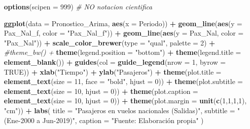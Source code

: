 \documentclass[
]{book}
\newenvironment{Shaded}{\begin{snugshade}}{\end{snugshade}}
\newcommand{\AttributeTok}[1]{\textcolor[rgb]{0.13,0.29,0.53}{#1}}
\newcommand{\CommentTok}[1]{\textcolor[rgb]{0.56,0.35,0.01}{\textit{#1}}}
\newcommand{\ConstantTok}[1]{\textcolor[rgb]{0.56,0.35,0.01}{#1}}
\newcommand{\DecValTok}[1]{\textcolor[rgb]{0.00,0.00,0.81}{#1}}
\newcommand{\FunctionTok}[1]{\textcolor[rgb]{0.13,0.29,0.53}{\textbf{#1}}}
\newcommand{\NormalTok}[1]{#1}
\newcommand{\SpecialCharTok}[1]{\textcolor[rgb]{0.81,0.36,0.00}{\textbf{#1}}}
\newcommand{\StringTok}[1]{\textcolor[rgb]{0.31,0.60,0.02}{#1}}
\begin{document}
\begin{Shaded}
\begin{Highlighting}[]
\FunctionTok{options}\NormalTok{(}\AttributeTok{scipen =} \DecValTok{999}\NormalTok{) }\CommentTok{\# NO notacion cientifica}

\FunctionTok{ggplot}\NormalTok{(}\AttributeTok{data =}\NormalTok{ Pronostico\_Arima, }\FunctionTok{aes}\NormalTok{(}\AttributeTok{x =}\NormalTok{ Periodo)) }\SpecialCharTok{+}
  \FunctionTok{geom\_line}\NormalTok{(}\FunctionTok{aes}\NormalTok{(}\AttributeTok{y =}\NormalTok{ Pax\_Nal\_f, }\AttributeTok{color =} \StringTok{"Pax\_Nal\_f"}\NormalTok{)) }\SpecialCharTok{+}
  \FunctionTok{geom\_line}\NormalTok{(}\FunctionTok{aes}\NormalTok{(}\AttributeTok{y =}\NormalTok{ Pax\_Nal, }\AttributeTok{color =} \StringTok{"Pax\_Nal"}\NormalTok{)) }\SpecialCharTok{+}
  \FunctionTok{scale\_color\_brewer}\NormalTok{(}\AttributeTok{type =} \StringTok{"qual"}\NormalTok{, }\AttributeTok{palette =} \DecValTok{2}\NormalTok{) }\SpecialCharTok{+}
  \CommentTok{\#theme\_bw() + }
  \FunctionTok{theme}\NormalTok{(}\AttributeTok{legend.position =} \StringTok{"bottom"}\NormalTok{) }\SpecialCharTok{+}
  \FunctionTok{theme}\NormalTok{(}\AttributeTok{legend.title =} \FunctionTok{element\_blank}\NormalTok{()) }\SpecialCharTok{+}
  \FunctionTok{guides}\NormalTok{(}\AttributeTok{col =} \FunctionTok{guide\_legend}\NormalTok{(}\AttributeTok{nrow =} \DecValTok{1}\NormalTok{, }\AttributeTok{byrow =} \ConstantTok{TRUE}\NormalTok{)) }\SpecialCharTok{+} 
  \FunctionTok{xlab}\NormalTok{(}\StringTok{"Tiempo"}\NormalTok{) }\SpecialCharTok{+} 
  \FunctionTok{ylab}\NormalTok{(}\StringTok{"Pasajeros"}\NormalTok{) }\SpecialCharTok{+} 
  \FunctionTok{theme}\NormalTok{(}\AttributeTok{plot.title =} \FunctionTok{element\_text}\NormalTok{(}\AttributeTok{size =} \DecValTok{11}\NormalTok{, }\AttributeTok{face =} \StringTok{"bold"}\NormalTok{, }
                                  \AttributeTok{hjust =} \DecValTok{0}\NormalTok{)) }\SpecialCharTok{+} 
  \FunctionTok{theme}\NormalTok{(}\AttributeTok{plot.subtitle =} \FunctionTok{element\_text}\NormalTok{(}\AttributeTok{size =} \DecValTok{10}\NormalTok{, }\AttributeTok{hjust =} \DecValTok{0}\NormalTok{)) }\SpecialCharTok{+} 
  \FunctionTok{theme}\NormalTok{(}\AttributeTok{plot.caption =} \FunctionTok{element\_text}\NormalTok{(}\AttributeTok{size =} \DecValTok{10}\NormalTok{, }\AttributeTok{hjust =} \DecValTok{0}\NormalTok{)) }\SpecialCharTok{+}
  \FunctionTok{theme}\NormalTok{(}\AttributeTok{plot.margin =} \FunctionTok{unit}\NormalTok{(}\FunctionTok{c}\NormalTok{(}\DecValTok{1}\NormalTok{,}\DecValTok{1}\NormalTok{,}\DecValTok{1}\NormalTok{,}\DecValTok{1}\NormalTok{), }\StringTok{"cm"}\NormalTok{)) }\SpecialCharTok{+}
  \FunctionTok{labs}\NormalTok{(}
    \AttributeTok{title =} \StringTok{"Pasajeros en vuelos nacionales (Salidas)"}\NormalTok{,}
    \AttributeTok{subtitle =} \StringTok{"(Ene{-}2000 a Jun{-}2019)"}\NormalTok{,}
    \AttributeTok{caption =} \StringTok{"Fuente: Elaboración propia"}
\NormalTok{  )}
\end{Highlighting}
\end{Shaded}
\end{document}
